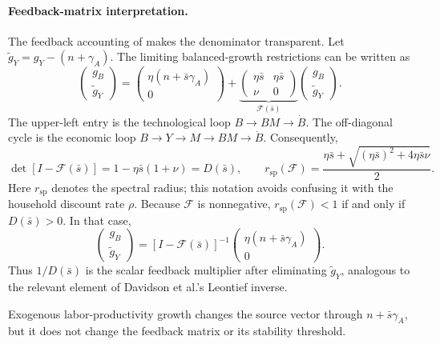 \paragraph{Feedback-matrix interpretation.}
The feedback accounting of \citet{davidsonetal2026} makes the denominator
transparent. Let \(\widetilde g_Y=g_Y-(n+\gamma_A)\). The limiting balanced-growth
restrictions can be written as
\begin{equation}
 \begin{pmatrix}g_B\\ \widetilde g_Y\end{pmatrix}
 =
 \begin{pmatrix}\eta(n+\bar s\gamma_A)\\0\end{pmatrix}
 +
 \underbrace{\begin{pmatrix}
  \eta\bar s&\eta\bar s\\
  \nu&0
 \end{pmatrix}}_{\mathcal F(\bar s)}
 \begin{pmatrix}g_B\\ \widetilde g_Y\end{pmatrix}.
 \label{eq:axm-feedback-matrix}
\end{equation}
The upper-left entry is the technological loop
\(B\to BM\to\dot B\). The off-diagonal cycle is the economic loop
\(B\to Y\to M\to BM\to\dot B\). Consequently,
\begin{equation}
 \det[I-\mathcal F(\bar s)]
 =1-\eta\bar s(1+\nu)=D(\bar s),
 \qquad
 r_{\mathrm{sp}}(\mathcal F)
 =\frac{\eta\bar s+
 \sqrt{(\eta\bar s)^2+4\eta\bar s\nu}}{2}.
 \label{eq:axm-feedback-radius}
\end{equation}
Here \(r_{\mathrm{sp}}\) denotes the spectral radius; this notation avoids
confusing it with the household discount rate \(\rho\). Because \(\mathcal F\)
is nonnegative, \(r_{\mathrm{sp}}(\mathcal F)<1\) if and only if
\(D(\bar s)>0\). In that case,
\[
 \begin{pmatrix}g_B\\ \widetilde g_Y\end{pmatrix}
 =[I-\mathcal F(\bar s)]^{-1}
 \begin{pmatrix}\eta(n+\bar s\gamma_A)\\0\end{pmatrix}.
\]
Thus \(1/D(\bar s)\) is the scalar feedback multiplier after eliminating
\(\widetilde g_Y\), analogous to the relevant element of Davidson et al.'s
Leontief inverse.

Exogenous labor-productivity growth changes the source vector through
\(n+\bar s\gamma_A\), but it does not change the feedback matrix or its
stability threshold.


